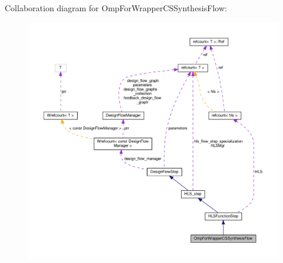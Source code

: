 Collaboration diagram for Omp\+For\+Wrapper\+C\+S\+Synthesis\+Flow\+:
\nopagebreak
\begin{figure}[H]
\begin{center}
\leavevmode
\includegraphics[width=350pt]{d2/da9/classOmpForWrapperCSSynthesisFlow__coll__graph}
\end{center}
\end{figure}
